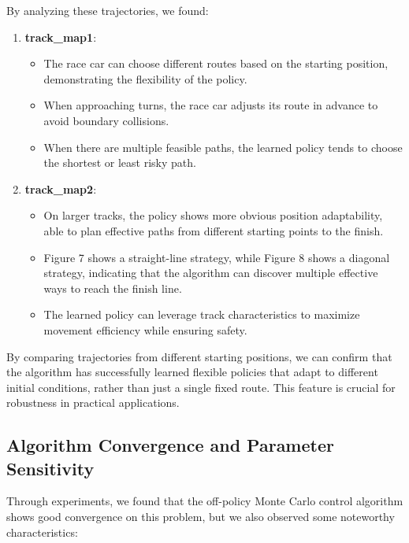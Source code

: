 \documentclass{article}
\begin{document}
By analyzing these trajectories, we found:

\begin{enumerate}
    \item \textbf{track\_map1}:
    \begin{itemize}
        \item The race car can choose different routes based on the starting position, demonstrating the flexibility of the policy.
        \item When approaching turns, the race car adjusts its route in advance to avoid boundary collisions.
        \item When there are multiple feasible paths, the learned policy tends to choose the shortest or least risky path.
    \end{itemize}
    
    \item \textbf{track\_map2}:
    \begin{itemize}
        \item On larger tracks, the policy shows more obvious position adaptability, able to plan effective paths from different starting points to the finish.
        \item Figure 7 shows a straight-line strategy, while Figure 8 shows a diagonal strategy, indicating that the algorithm can discover multiple effective ways to reach the finish line.
        \item The learned policy can leverage track characteristics to maximize movement efficiency while ensuring safety.
    \end{itemize}
\end{enumerate}

By comparing trajectories from different starting positions, we can confirm that the algorithm has successfully learned flexible policies that adapt to different initial conditions, rather than just a single fixed route. This feature is crucial for robustness in practical applications.

\subsection{Algorithm Convergence and Parameter Sensitivity}
Through experiments, we found that the off-policy Monte Carlo control algorithm shows good convergence on this problem, but we also observed some noteworthy characteristics:
\end{document}
